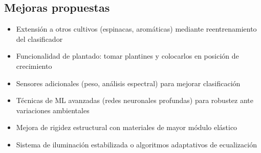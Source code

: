 \subsection*{Mejoras propuestas}

\begin{itemize}
    \item Extensión a otros cultivos (espinacas, aromáticas) mediante reentrenamiento del clasificador
    \item Funcionalidad de plantado: tomar plantines y colocarlos en posición de crecimiento
    \item Sensores adicionales (peso, análisis espectral) para mejorar clasificación
    \item Técnicas de ML avanzadas (redes neuronales profundas) para robustez ante variaciones ambientales
    \item Mejora de rigidez estructural con materiales de mayor módulo elástico
    \item Sistema de iluminación estabilizada o algoritmos adaptativos de ecualización
\end{itemize}